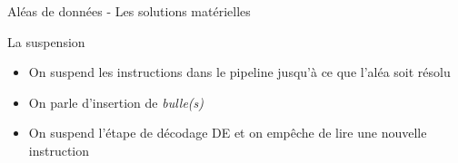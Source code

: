 %
\begin{Frame}{Aléas de données - Les solutions matérielles}

  \begin{block}{La suspension}
       \begin{center}
 	\begin{itemize}
          \item On suspend les instructions dans le pipeline jusqu'à ce que l'aléa soit résolu
          \item On parle d'insertion de \emph{bulle(s)} 
	\item On suspend l'étape de décodage DE et on empêche de lire une nouvelle instruction
        \end{itemize}
       \end{center}
      \end{block}   

\vspace{-0.1cm}
        \begin{center}
        \end{center}
 


\end{Frame}


